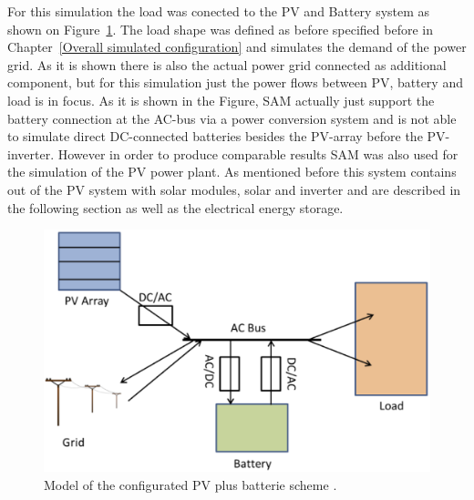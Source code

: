 For this simulation the load was conected to the PV and Battery system as shown on Figure~\ref{PV_model_config}. The load shape was defined as before specified before in Chapter~\ref{Overall simulated configuration} and simulates the demand of the power grid. As it is shown there is also the actual power grid connected as additional component, but for this simulation just the power flows between PV, battery and load is in focus. As it is shown in the Figure, SAM actually just support the battery connection at the AC-bus via a power conversion system and is not able to simulate direct DC-connected batteries besides the PV-array before the PV-inverter. However in order to produce comparable results SAM was also used for the simulation of the PV power plant. As mentioned before this system contains out of the PV system with solar modules, solar and inverter and are described in the following section as well as the electrical energy storage.
\begin{figure}[htbp]  
\centering
\includegraphics[width=0.55\linewidth]{FIG/PV_model_config}
\caption[Model of the configurated PV plus batterie scheme.]{Model of the configurated PV plus batterie scheme \cite{Diorio2015}.}\label{PV_model_config}
\end{figure}
